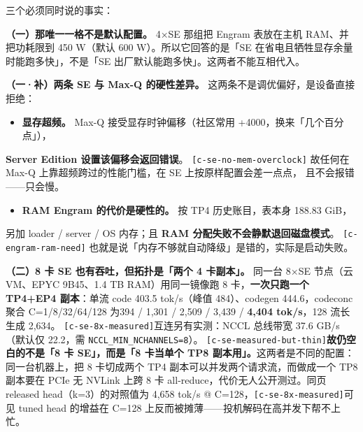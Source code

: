 三个必须同时说的事实：


\textbf{（一）那唯一一格不是默认配置。} 4×SE 那组把 Engram 表放在主机 RAM、并把功耗限到 450 W（默认 600 W）。所以它回答的是「SE 在省电且牺牲显存余量时能跑多快」，不是「SE 出厂默认能跑多快」。这两者不能互相代入。


\textbf{（一·补）两条 SE 与 Max-Q 的硬性差异。} 这两条不是调优偏好，是设备直接拒绝：


\begin{itemize}
  \item \textbf{显存超频。} Max-Q 接受显存时钟偏移（社区常用 +4000，换来「几个百分点」），
\end{itemize}
  \textbf{Server Edition 设置该偏移会返回错误}。 {\scriptsize\texttt{[c-\hspace{0pt}se-\hspace{0pt}no-\hspace{0pt}mem-\hspace{0pt}overclock]}}  故任何在 Max-Q 上靠超频跨过的性能门槛，在 SE 上按原样配置会差一点点，  且不会报错——只会慢。

\begin{itemize}
  \item \textbf{RAM Engram 的代价是硬性的。} 按 TP4 历史账目，表本身 188.83 GiB，
\end{itemize}
  另加 loader / server / OS 内存；且 \textbf{RAM 分配失败不会静默退回磁盘模式}。 {\scriptsize\texttt{[c-\hspace{0pt}engram-\hspace{0pt}ram-\hspace{0pt}need]}}  也就是说「内存不够就自动降级」是错的，实际是启动失败。


\textbf{（二）8 卡 SE 也有吞吐，但拓扑是「两个 4 卡副本」。} 同一台 8×SE 节点（云 VM、EPYC 9B45、1.4 TB RAM）用同一镜像跑 8 卡，\textbf{一次只跑一个 TP4+EP4 副本}：单流 code 403.5 tok/s（峰值 484）、codegen 444.6，codeconc 聚合 C=1/8/32/64/128 为394 / 1,301 / 2,509 / 3,439 / \textbf{4,404 tok/s}，128 流长生成 2,634。 {\scriptsize\texttt{[c-\hspace{0pt}se-\hspace{0pt}8x-\hspace{0pt}measured]}}互连另有实测：NCCL 总线带宽 37.6 GB/s（默认仅 22.2，需 \texttt{NCCL\_MIN\_NCHANNELS=8}）。 {\scriptsize\texttt{[c-\hspace{0pt}se-\hspace{0pt}measured-\hspace{0pt}but-\hspace{0pt}thin]}}\textbf{故仍空白的不是「8 卡 SE」，而是「8 卡当单个 TP8 副本用」。}这两者是不同的配置：同一台机器上，把 8 卡切成两个 TP4 副本可以并发两个请求流，而做成一个 TP8 副本要在 PCIe 无 NVLink 上跨 8 卡 all-reduce，代价无人公开测过。同页 released head（k=3）的对照值为 4,658 tok/s @ C=128，{\scriptsize\texttt{[c-\hspace{0pt}se-\hspace{0pt}8x-\hspace{0pt}measured]}}可见 tuned head 的增益在 C=128 上反而被摊薄——投机解码在高并发下帮不上忙。


